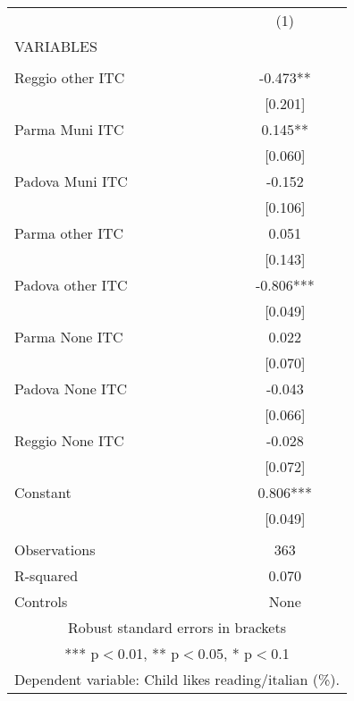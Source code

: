 \begin{tabular}{lc} \hline
 & (1) \\
VARIABLES &  \\ \hline
 &  \\
Reggio other ITC & -0.473** \\
 & [0.201] \\
Parma Muni ITC & 0.145** \\
 & [0.060] \\
Padova Muni ITC & -0.152 \\
 & [0.106] \\
Parma other ITC & 0.051 \\
 & [0.143] \\
Padova other ITC & -0.806*** \\
 & [0.049] \\
Parma None ITC & 0.022 \\
 & [0.070] \\
Padova None ITC & -0.043 \\
 & [0.066] \\
Reggio None ITC & -0.028 \\
 & [0.072] \\
Constant & 0.806*** \\
 & [0.049] \\
 &  \\
Observations & 363 \\
R-squared & 0.070 \\
 Controls & None \\ \hline
\multicolumn{2}{c}{ Robust standard errors in brackets} \\
\multicolumn{2}{c}{ *** p$<$0.01, ** p$<$0.05, * p$<$0.1} \\
\multicolumn{2}{c}{ Dependent variable: Child likes reading/italian (\%).} \\
\end{tabular}
